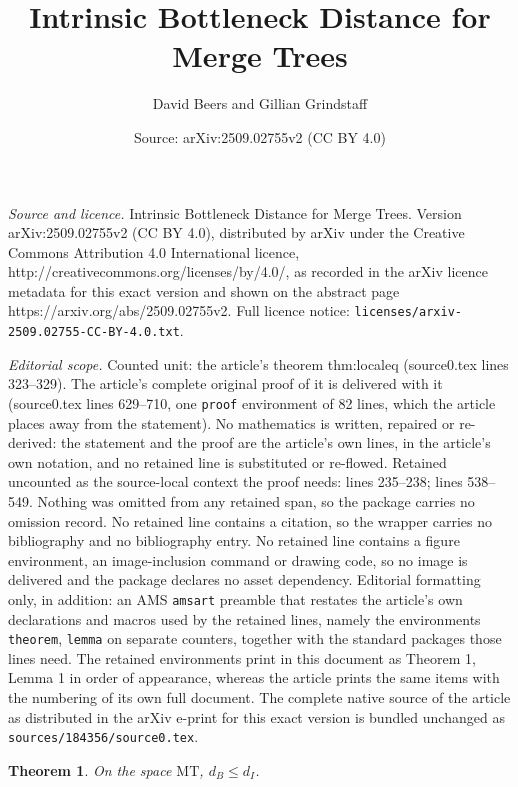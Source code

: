 \documentclass[10pt,a4paper]{amsart}
\title{Intrinsic Bottleneck Distance for Merge Trees}
\author{David Beers\; and Gillian Grindstaff}
\date{Source: arXiv:2509.02755v2 (CC BY 4.0)}
\newtheorem{theorem}{Theorem}
\newcommand{\MT}{\mathrm{MT}}
\begin{document}
\maketitle

\noindent\emph{Source and licence.} Intrinsic Bottleneck Distance for Merge Trees. Version arXiv:2509.02755v2 (CC BY 4.0), distributed by arXiv under the Creative Commons Attribution 4.0 International licence, http://creativecommons.org/licenses/by/4.0/, as recorded in the arXiv licence metadata for this exact version and shown on the abstract page https://arxiv.org/abs/2509.02755v2. Full licence notice: \texttt{licenses/arxiv-2509.02755-CC-BY-4.0.txt}.\par\smallskip

\noindent\textit{Editorial scope.} Counted unit: the article's theorem thm:localeq (source0.tex lines 323--329). The article's complete original proof of it is delivered with it (source0.tex lines 629--710, one \texttt{proof} environment of 82 lines, which the article places away from the statement). No mathematics is written, repaired or re-derived: the statement and the proof are the article's own lines, in the article's own notation, and no retained line is substituted or re-flowed.  Retained uncounted as the source-local context the proof needs: lines 235--238; lines 538--549.  Nothing was omitted from any retained span, so the package carries no omission record.  No retained line contains a citation, so the wrapper carries no bibliography and no bibliography entry.  No retained line contains a figure environment, an image-inclusion command or drawing code, so no image is delivered and the package declares no asset dependency.  Editorial formatting only, in addition: an AMS \texttt{amsart} preamble that restates the article's own declarations and macros used by the retained lines, namely the environments \texttt{theorem}, \texttt{lemma} on separate counters, together with the standard packages those lines need.  The retained environments print in this document as Theorem 1, Lemma 1 in order of appearance, whereas the article prints the same items with the numbering of its own full document.  The complete native source of the article as distributed in the arXiv e-print for this exact version is bundled unchanged as \texttt{sources/184356/source0.tex}.
\begin{theorem}
    \label{thm:bottlelessthaninterleaving}
    On the space $\MT$, $d_B \leq d_I$.
\end{theorem}
\end{document}
